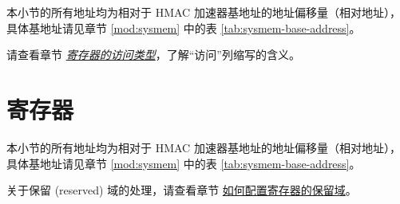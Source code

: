 \documentclass[main\_\_CN.tex]{subfiles}
\begin{document}
本小节的所有地址均为相对于 HMAC 加速器基地址的地址偏移量（相对地址），具体基地址请见章节 \ref{mod:sysmem} \textit{} 中的表 \ref{tab:sysmem-base-address}。

请查看章节 \hyperref[glossary-access-types]{\textit{寄存器的访问类型}}，了解“访问”列缩写的含义。






\newpage
\section{寄存器}

本小节的所有地址均为相对于 HMAC 加速器基地址的地址偏移量（相对地址），具体基地址请见章节 \ref{mod:sysmem} \textit{} 中的表 \ref{tab:sysmem-base-address}。

关于保留 (reserved) 域的处理，请查看章节 \hyperref[programming-reserved-field]{如何配置寄存器的保留域}。


\end{document}
